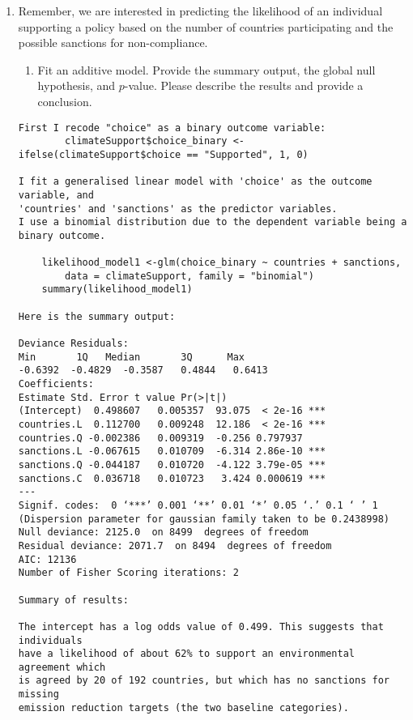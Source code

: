 \documentclass[12pt,letterpaper]{article}
\begin{document}
\begin{enumerate}
	\item
	Remember, we are interested in predicting the likelihood of an individual supporting a policy based on the number of countries participating and the possible sanctions for non-compliance.
	\begin{enumerate}
		\item [] Fit an additive model. Provide the summary output, the global null hypothesis, and $p$-value. Please describe the results and provide a conclusion.
	\end{enumerate}
	
	\begin{verbatim}
First I recode "choice" as a binary outcome variable:
		climateSupport$choice_binary <- ifelse(climateSupport$choice == "Supported", 1, 0)
		
I fit a generalised linear model with 'choice' as the outcome variable, and
'countries' and 'sanctions' as the predictor variables.
I use a binomial distribution due to the dependent variable being a binary outcome.

	likelihood_model1 <-glm(choice_binary ~ countries + sanctions,
		data = climateSupport, family = "binomial")
	summary(likelihood_model1)

Here is the summary output:

Deviance Residuals: 
Min       1Q   Median       3Q      Max  
-0.6392  -0.4829  -0.3587   0.4844   0.6413  
Coefficients:
Estimate Std. Error t value Pr(>|t|)    
(Intercept)  0.498607   0.005357  93.075  < 2e-16 ***
countries.L  0.112700   0.009248  12.186  < 2e-16 ***
countries.Q -0.002386   0.009319  -0.256 0.797937    
sanctions.L -0.067615   0.010709  -6.314 2.86e-10 ***
sanctions.Q -0.044187   0.010720  -4.122 3.79e-05 ***
sanctions.C  0.036718   0.010723   3.424 0.000619 ***
---
Signif. codes:  0 ‘***’ 0.001 ‘**’ 0.01 ‘*’ 0.05 ‘.’ 0.1 ‘ ’ 1
(Dispersion parameter for gaussian family taken to be 0.2438998)
Null deviance: 2125.0  on 8499  degrees of freedom
Residual deviance: 2071.7  on 8494  degrees of freedom
AIC: 12136
Number of Fisher Scoring iterations: 2

Summary of results:

The intercept has a log odds value of 0.499. This suggests that individuals
have a likelihood of about 62% to support an environmental agreement which
is agreed by 20 of 192 countries, but which has no sanctions for missing
emission reduction targets (the two baseline categories).


\end{verbatim}
\end{enumerate}
\end{document}
